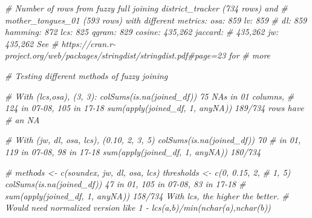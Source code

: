 \documentclass[
]{article}
\newenvironment{Shaded}{\begin{snugshade}}{\end{snugshade}}
\newcommand{\CommentTok}[1]{\textcolor[rgb]{0.56,0.35,0.01}{\textit{#1}}}
\begin{document}
\begin{Shaded}
\begin{Highlighting}[]
\CommentTok{\# Number of rows from fuzzy full joining district\_tracker (734 rows) and}
\CommentTok{\# mother\_tongues\_01 (593 rows) with different metrics: \textquotesingle{}osa\textquotesingle{}: 859 \textquotesingle{}lv\textquotesingle{}: 859}
\CommentTok{\# \textquotesingle{}dl\textquotesingle{}: 859 \textquotesingle{}hamming\textquotesingle{}: 872 \textquotesingle{}lcs\textquotesingle{}: 825 \textquotesingle{}qgram\textquotesingle{}: 829 \textquotesingle{}cosine\textquotesingle{}: 435,262 \textquotesingle{}jaccard\textquotesingle{}:}
\CommentTok{\# 435,262 \textquotesingle{}jw\textquotesingle{}: 435,262 See}
\CommentTok{\# https://cran.r{-}project.org/web/packages/stringdist/stringdist.pdf\#page=23 for}
\CommentTok{\# more}



\CommentTok{\# Testing different methods of fuzzy joining}

\CommentTok{\# With (\textquotesingle{}lcs\textquotesingle{},\textquotesingle{}osa\textquotesingle{}), (3, 3): colSums(is.na(joined\_df)) 75 NAs in 01 columns,}
\CommentTok{\# 124 in 07{-}08, 105 in 17{-}18 sum(apply(joined\_df, 1, anyNA)) 189/734 rows have}
\CommentTok{\# an NA}

\CommentTok{\# With (\textquotesingle{}jw\textquotesingle{}, \textquotesingle{}dl\textquotesingle{}, \textquotesingle{}osa\textquotesingle{}, \textquotesingle{}lcs\textquotesingle{}), (0.10, 2, 3, 5) colSums(is.na(joined\_df)) 70}
\CommentTok{\# in 01, 119 in 07{-}08, 98 in 17{-}18 sum(apply(joined\_df, 1, anyNA)) 180/734}

\CommentTok{\# methods \textless{}{-} c(\textquotesingle{}soundex\textquotesingle{}, \textquotesingle{}jw\textquotesingle{}, \textquotesingle{}dl\textquotesingle{}, \textquotesingle{}osa\textquotesingle{}, \textquotesingle{}lcs\textquotesingle{}) thresholds \textless{}{-} c(0, 0.15, 2,}
\CommentTok{\# 1, 5) colSums(is.na(joined\_df)) 47 in 01, 105 in 07{-}08, 83 in 17{-}18}
\CommentTok{\# sum(apply(joined\_df, 1, anyNA)) 158/734 With lcs, the higher the better.}
\CommentTok{\# Would need normalized version like 1 {-} lcs(a,b)/min(nchar(a),nchar(b))}




\end{Highlighting}
\end{Shaded}
\end{document}
